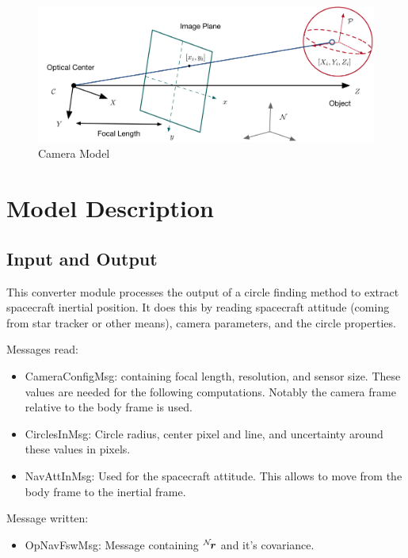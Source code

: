 

\begin{figure}[H]
	\centerline{
		\includegraphics{Figures/CameraGeometry}
	}
	\caption{Camera Model}
	\label{fig:camera}
\end{figure}

\section{Model Description}

\subsection{Input and Output}

This converter module processes the output of a circle finding method to extract spacecraft inertial position. It does this by reading spacecraft attitude (coming from star tracker or other means), camera parameters, and the circle properties. 

Messages read:

\begin{itemize}
\item CameraConfigMsg: containing focal length, resolution, and sensor size. These values are needed for the following computations. Notably the camera frame relative to the body frame is used.
\item CirclesInMsg: Circle radius, center pixel and line, and uncertainty around these values in pixels. 
\item NavAttInMsg: Used for the spacecraft attitude. This allows to move from the body frame to the inertial frame.
\end{itemize}

Message written:
\begin{itemize}
\item OpNavFswMsg: Message containing $\leftexp{N}{\bm r}$ and it's covariance.
\end{itemize}

